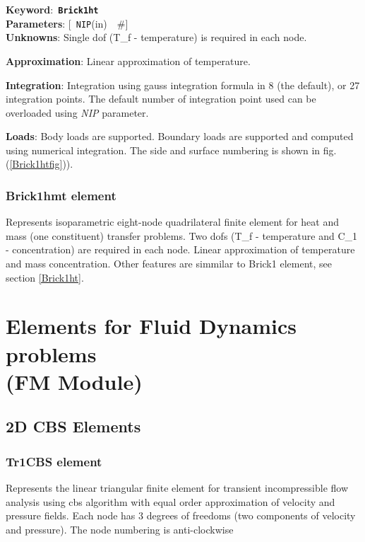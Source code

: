 \documentclass[a4paper]{article}
\newcommand{\descitem}[1]{{\noindent \bf #1}:}
\newcommand{\elemkeyword}[1]{\descitem{Keyword}~{\bf \texttt{#1}}}
\newcommand{\elemparam}[2]{{{\texttt{#1}\tiny (#2)}~~\#}}
\newcommand{\optelemparam}[2]{{[~\elemparam{#1}{#2}]}}
\newcommand{\param}[1]{{\em #1}}
\begin{document}
\elemkeyword{Brick1ht}\\
\descitem{Parameters} \optelemparam{NIP}{in}\\
\descitem{Unknowns}
Single dof (T\_f - temperature) is required in each node.

\descitem{Approximation} Linear approximation of temperature.

\descitem{Integration}
Integration using gauss integration formula
in 8 (the default), or 27 integration points. The default number of
integration point used can be overloaded using \param{NIP} parameter.

\descitem{Loads} Body loads are supported. Boundary loads are
supported and computed using numerical integration. The side and
surface numbering is shown in fig. (\ref{Brick1htfig})).

\subsubsection{Brick1hmt element}
Represents isoparametric eight-node quadrilateral finite element for
heat and mass (one constituent) transfer problems. 
Two dofs (T\_f - temperature and C\_1 - concentration) are required in
each node. Linear approximation of temperature and mass concentration.
Other features are simmilar to Brick1 element, see section \ref{Brick1ht}.

\section{Elements for Fluid Dynamics problems\\(FM Module)}
\subsection{2D CBS Elements}
\subsubsection{Tr1CBS element}
\label{Tr1CBS}
Represents the linear triangular finite element for transient
incompressible flow analysis using cbs algorithm with equal order
approximation of velocity and pressure fields. Each node has 3 degrees
of freedoms (two components of velocity and pressure).
The node numbering is anti-clockwise
\end{document}
